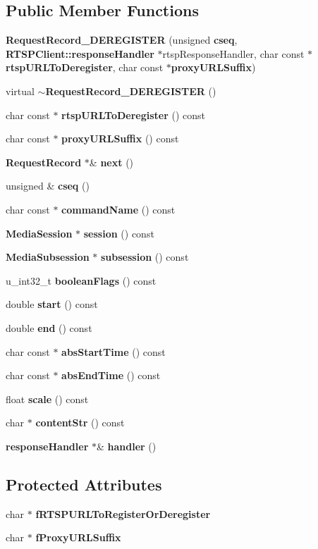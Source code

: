 \subsection*{Public Member Functions}
\begin{DoxyCompactItemize}
\item 
{\bf Request\+Record\+\_\+\+D\+E\+R\+E\+G\+I\+S\+T\+E\+R} (unsigned {\bf cseq}, {\bf R\+T\+S\+P\+Client\+::response\+Handler} $\ast$rtsp\+Response\+Handler, char const $\ast${\bf rtsp\+U\+R\+L\+To\+Deregister}, char const $\ast${\bf proxy\+U\+R\+L\+Suffix})
\item 
virtual {\bf $\sim$\+Request\+Record\+\_\+\+D\+E\+R\+E\+G\+I\+S\+T\+E\+R} ()
\item 
char const $\ast$ {\bf rtsp\+U\+R\+L\+To\+Deregister} () const 
\item 
char const $\ast$ {\bf proxy\+U\+R\+L\+Suffix} () const 
\item 
{\bf Request\+Record} $\ast$\& {\bf next} ()
\item 
unsigned \& {\bf cseq} ()
\item 
char const $\ast$ {\bf command\+Name} () const 
\item 
{\bf Media\+Session} $\ast$ {\bf session} () const 
\item 
{\bf Media\+Subsession} $\ast$ {\bf subsession} () const 
\item 
u\+\_\+int32\+\_\+t {\bf boolean\+Flags} () const 
\item 
double {\bf start} () const 
\item 
double {\bf end} () const 
\item 
char const $\ast$ {\bf abs\+Start\+Time} () const 
\item 
char const $\ast$ {\bf abs\+End\+Time} () const 
\item 
float {\bf scale} () const 
\item 
char $\ast$ {\bf content\+Str} () const 
\item 
{\bf response\+Handler} $\ast$\& {\bf handler} ()
\end{DoxyCompactItemize}
\subsection*{Protected Attributes}
\begin{DoxyCompactItemize}
\item 
char $\ast$ {\bf f\+R\+T\+S\+P\+U\+R\+L\+To\+Register\+Or\+Deregister}
\item 
char $\ast$ {\bf f\+Proxy\+U\+R\+L\+Suffix}
\end{DoxyCompactItemize}


